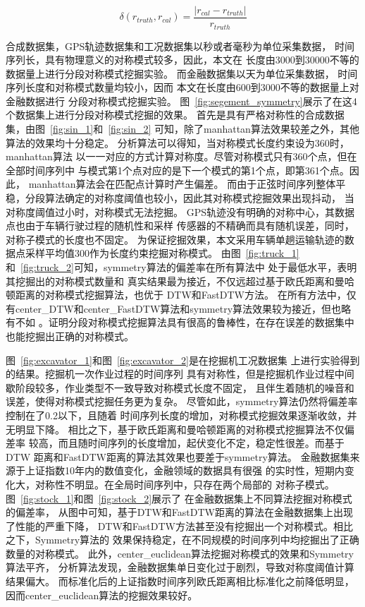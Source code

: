 \begin{equation}
  \delta \left( r_{truth}, r_{cal} \right) = \frac{\left| r_{cal} - r_{truth} \right|}{r_{truth}}
  \label{eq:variation}
\end{equation}

合成数据集，GPS轨迹数据集和工况数据集以秒或者毫秒为单位采集数据，
时间序列长，具有物理意义的对称模式较多，因此，本文在
长度由3000到30000不等的数据量上进行分段对称模式挖掘实验。
而金融数据集以天为单位采集数据，
时间序列长度和对称模式数量均较小，因而
本文在长度由600到3000不等的数据量上对金融数据进行
分段对称模式挖掘实验。
图~\ref{fig:segement_symmetry}展示了在这4个数据集上进行分段对称模式挖掘的效果。
首先是具有严格对称性的合成数据集，由图~\ref{fig:sin_1}和~\ref{fig:sin_2}
可知，除了manhattan算法效果较差之外，其他算法的效果均十分稳定。
分析算法可以得知，当对称模式长度约束设为360时，manhattan算法
以一一对应的方式计算对称度。尽管对称模式只有360个点，但在全部时间序列中
与模式第1个点对应的是下一个模式的第1个点，即第361个点。因此，
manhattan算法会在匹配点计算时产生偏差。
而由于正弦时间序列整体平稳，分段算法确定的对称度阈值也较小，因此其对称模式挖掘效果出现抖动，
当对称度阈值过小时，对称模式无法挖掘。
GPS轨迹没有明确的对称中心，其数据点也由于车辆行驶过程的随机性和采样
传感器的不精确而具有随机误差，同时，对称子模式的长度也不固定。
为保证挖掘效果，本文采用车辆单趟运输轨迹的数据点采样平均值300作为长度约束挖掘对称模式。
由图~\ref{fig:truck_1}和~\ref{fig:truck_2}可知，symmetry算法的偏差率在所有算法中
处于最低水平，表明其挖掘出的对称模式数量和
真实结果最为接近，不仅远超过基于欧氏距离和曼哈顿距离的对称模式挖掘算法，也优于
DTW和FastDTW方法。
在所有方法中，仅有center\_DTW和center\_FastDTW算法和symmetry算法效果较为接近，但也略有不如
。证明分段对称模式挖掘算法具有很高的鲁棒性，在存在误差的数据集中
也能挖掘出正确的对称模式。

图~\ref{fig:excavator_1}和图~\ref{fig:excavator_2}是在挖掘机工况数据集
上进行实验得到的结果。挖掘机一次作业过程的时间序列
具有对称性，但是挖掘机作业过程中间歇阶段较多，作业类型不一致导致对称模式长度不固定，
且伴生着随机的噪音和误差，使得对称模式挖掘任务更为复杂。
尽管如此，symmetry算法仍然将偏差率控制在了0.2以下，且随着
时间序列长度的增加，对称模式挖掘效果逐渐收敛，并无明显下降。
相比之下，基于欧氏距离和曼哈顿距离的对称模式挖掘算法不仅偏差率
较高，而且随时间序列的长度增加，起伏变化不定，稳定性很差。而基于DTW
距离和FastDTW距离的算法其效果也要差于symmetry算法。
金融数据集来源于上证指数10年内的数值变化，金融领域的数据具有很强
的实时性，短期内变化大，对称性不明显。在全局时间序列中，只存在两个局部的
对称子模式。图~\ref{fig:stock_1}和图~\ref{fig:stock_2}展示了
在金融数据集上不同算法挖掘对称模式的偏差率，
从图中可知，基于DTW和FastDTW距离的算法在金融数据集上出现了性能的严重下降，
DTW和FastDTW方法甚至没有挖掘出一个对称模式。相比之下，Symmetry算法的
效果保持稳定，在不同规模的时间序列中均挖掘出了正确数量的对称模式。
此外，center\_euclidean算法挖掘对称模式的效果和Symmetry算法平齐，
分析算法发现，金融数据集单日变化过于剧烈，导致对称度阈值计算结果偏大。
而标准化后的上证指数时间序列欧氏距离相比标准化之前降低明显，
因而center\_euclidean算法的挖掘效果较好。

